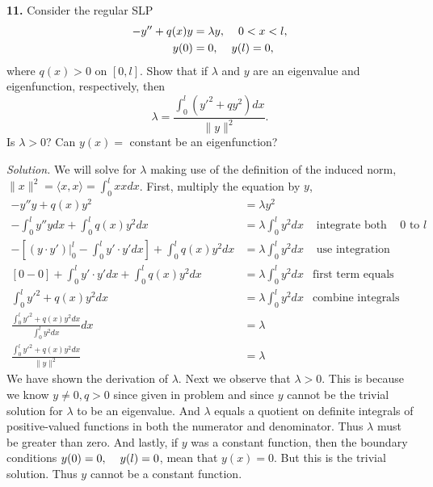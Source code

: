 \documentclass{article}
\begin{document}
\newpage
\textbf{11.} Consider the regular SLP
\begin{align*}
-y''+ q(x)y &= \lambda y, \hspace{4mm} 0<x<l, \\
y(0)&=0,\hspace{4mm} y(l)=0, 
\end{align*}
where \(q(x)>0\) on \([0,l]\). Show that if \(\lambda\) and \(y\) are an eigenvalue and eigenfunction, respectively, then 
\[
\lambda = \frac{ \int_0^l (y'^2+qy^2)dx}{\|y\|^2} .
\]
Is \(\lambda >0\)? Can \(y(x)= \) constant be an eigenfunction? 

\vspace{3mm}
\textit{Solution.} We will solve for \(\lambda \) making use of the definition of the induced norm, \( \|x\|^2= \langle x,x\rangle = \int_0^l x x dx \). First, multiply the equation by \(y\), 
\begin{align*}
-y''y+q(x)y^2 &= \lambda y^2  &   \text{ } &\\
-\int_0^l y''y dx+ \int_0^l q(x)y^2 dx&= \lambda \int_0^l y^2 dx& \text{ integrate both sides from \(0\) to \(l\)}\\
-\left[ (y\cdot y') \Big|_0^l -\int_0^l y' \cdot y' dx \right ] + \int_0^l q(x)y^2 dx&= \lambda \int_0^l y^2 dx& \text{ use integration by parts on first term} \\
[0-0] + \int_0^l y' \cdot y' dx + \int_0^l q(x)y^2 dx&= \lambda \int_0^l y^2 dx& \text{first term equals zero by BCs}\\
\int_0^l  y'^2 +q(x)y^2 dx&= \lambda \int_0^l y^2 dx& \text{combine integrals since same limits of integration}\\
\frac{\int_0^l  y'^2 +q(x)y^2 dx}{\int_0^l y^2 dx}dx&= \lambda \\
 \frac{\int_0^l  y'^2 +q(x)y^2 dx}{\|y\|^2}&= \lambda
\end{align*}
We have shown the derivation of \(\lambda\). Next we observe that \(\lambda >0\). This is because we know \(y \neq 0, q>0\) since given in problem and since \(y\) cannot be the trivial solution for \(\lambda \) to be an eigenvalue. And \( \lambda \) equals a quotient on definite integrals of positive-valued functions in both the numerator and denominator. Thus \(\lambda \) must be greater than zero. And lastly, if \(y\) was a constant function, then the boundary conditions \(y(0)=0,\hspace{4mm} y(l)=0\), mean that \(y(x)=0\). But this is the trivial solution. Thus \(y\) cannot be a constant function.
\end{document}

